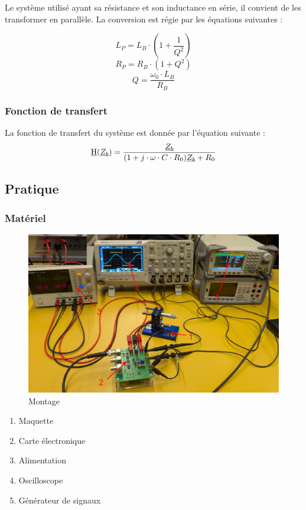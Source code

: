 Le système utilisé ayant sa résistance et son inductance en série, il convient de les transformer en
parallèle. La conversion est régie par les équations suivantes :

\begin{equation*}
    L_P = L_B \cdot (1+ \frac{1}{Q^2})
\end{equation*}
\begin{equation*}
    R_P = R_B \cdot (1 + Q^2)
\end{equation*}
\begin{equation*}
    Q = \frac{\omega_0\cdot L_B}{R_B}
\end{equation*}

\subsubsection{Fonction de transfert}
La fonction de transfert du système est donnée par l'équation suivante :
\begin{equation*}
    \underbar{H}(\underbar{$Z_b$}) = \frac{\underbar{$Z_b$}}{(1+j\cdot\omega \cdot C \cdot R_0)\underbar{$Z_b$}+R_0}
\end{equation*}

\subsection{Pratique}
\subsubsection{Matériel}
\begin{figure}[H]
    \centering
    \includegraphics[width=15cm]{Images/Seance2/Montage.png}
    \caption{Montage}
    \label{fig:montage}
\end{figure}
\begin{enumerate}
    \item Maquette
    \item Carte électronique
    \item Alimentation
    \item Oscilloscope
    \item Générateur de signaux
\end{enumerate}

